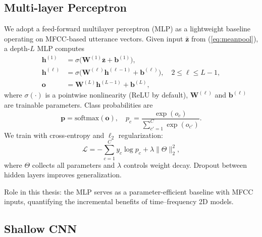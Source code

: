 \subsection{Multi-layer Perceptron}

We adopt a feed-forward multilayer perceptron (MLP) as a lightweight baseline operating on MFCC-based utterance vectors. Given input \(\bar{\mathbf{z}}\) from (\ref{eq:meanpool}), a depth-\(L\) MLP computes
\begin{align}\label{eq:mlp}
\mathbf{h}^{(1)} &= \sigma\!\big( \mathbf{W}^{(1)} \bar{\mathbf{z}} + \mathbf{b}^{(1)} \big),\\
\mathbf{h}^{(\ell)} &= \sigma\!\big( \mathbf{W}^{(\ell)} \mathbf{h}^{(\ell-1)} + \mathbf{b}^{(\ell)} \big), \quad 2\le \ell \le L-1,\\
\mathbf{o} &= \mathbf{W}^{(L)} \mathbf{h}^{(L-1)} + \mathbf{b}^{(L)},
\end{align}
where \(\sigma(\cdot)\) is a pointwise nonlinearity (ReLU by default), \(\mathbf{W}^{(\ell)}\) and \(\mathbf{b}^{(\ell)}\) are trainable parameters. Class probabilities are
\begin{equation}\label{eq:softmax}
\mathbf{p} = \mathrm{softmax}(\mathbf{o}), \quad p_c = \frac{\exp(o_c)}{\sum_{c'=1}^{C} \exp(o_{c'})}.
\end{equation}
We train with cross-entropy and \(\ell_2\) regularization:
\begin{equation}\label{eq:ce}
\mathcal{L} = - \sum_{c=1}^{C} y_c \log p_c + \lambda \lVert \Theta \rVert_2^2,
\end{equation}
where \(\Theta\) collects all parameters and \(\lambda\) controls weight decay. Dropout between hidden layers improves generalization.

Role in this thesis: the MLP serves as a parameter-efficient baseline with MFCC inputs, quantifying the incremental benefits of time–frequency 2D models.

\subsection{Shallow CNN}

